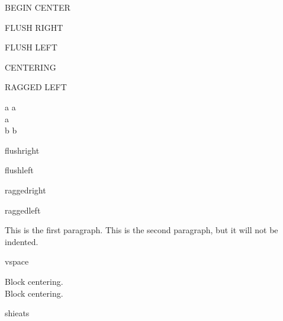 \documentclass{article}
\begin{document}
\begin{center}
BEGIN CENTER
\end{center}

\begin{flushright} FLUSH RIGHT \end{flushright}

\begin{flushleft} FLUSH LEFT \end{flushleft}

{\centering CENTERING \par}

{\raggedleft RAGGED LEFT \par}





a \newline
a \\
a \\

b
b

\flushright
flushright

\flushleft
flushleft

\raggedright
raggedright

\raggedleft
raggedleft


\flushleft

This is the first paragraph.
\noindent This is the second paragraph, but it will not be indented.

\centering

\vspace{1cm}

vspace 

\vspace{1cm}

{\centering
Block centering. \\
Block centering. \par
}


shieats
\end{document}
